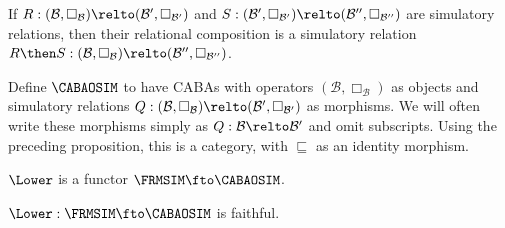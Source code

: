 \begin{proposition}
  \label{proposition:simulatory-compose}
  If
  \(R : (\mathcal{B}, \Box_\mathcal{B}) \relto (\mathcal{B}',
  \Box_{\mathcal{B}'})\) and
  \(S : (\mathcal{B}', \Box_{\mathcal{B}'}) \relto (\mathcal{B}'',
  \Box_{\mathcal{B}''})\) are simulatory relations, then their relational
  composition is a simulatory relation
  \(R \then S : (\mathcal{B}, \Box_\mathcal{B}) \relto (\mathcal{B}'',
  \Box_{\mathcal{B}''})\).
\end{proposition}

Define \(\CABAOSIM\) to have CABAs with operators \((\mathcal{B},
\Box_\mathcal{B})\) as objects and simulatory relations
\(Q : (\mathcal{B}, \Box_\mathcal{B}) \relto (\mathcal{B}',
\Box_{\mathcal{B}'})\) as morphisms. We will often write these
morphisms simply as \(Q : \mathcal{B} \relto \mathcal{B}'\) and omit
subscripts. Using the preceding proposition, this is a category, with
\(\sqsubseteq\) as an identity morphism.

\begin{lemma}
  \label{lemma:lower-frmsim-functor}
  \(\Lower\) is a functor \(\FRMSIM \fto \CABAOSIM\).
\end{lemma}

\begin{lemma}
  \label{lemma:lower-frmsim-faithful}
  \(\Lower : \FRMSIM \fto \CABAOSIM\) is faithful.
\end{lemma}

